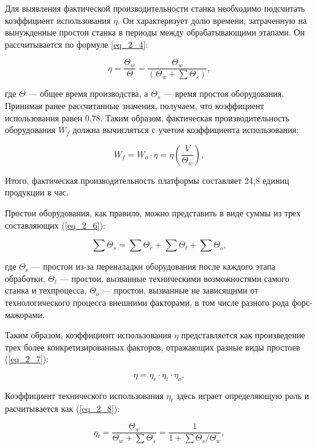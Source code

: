 Для выявления фактической производительности станка необходимо подсчитать коэффициент использования $\eta$. Он характеризует долю времени, затраченную на вынужденные простои станка в периоды между обрабатывающими этапами. Он рассчитывается по формуле \ref{eq_2_4}:

\begin{equation}
\eta = \frac{\Theta_w}{\Theta} = \frac{\Theta_w}{(\Theta_w + \sum \Theta_s)},
\label{eq_2_4}
\end{equation}

где $\Theta$ --- общее время производства, а $\Theta_s$ --- время простоя оборудования. Принимая ранее рассчитанные значения, получаем, что коэффициент использования равен 0,78. Таким образом, фактическая производительность оборудования $W_f$ должна вычисляться с учетом коэффициента использования:

\begin{equation}
W_f = W_o \cdot \eta = \eta (\frac{V}{\Theta_w}),
\label{eq_2_5}
\end{equation}

Итого, фактическая производительность платформы составляет 24,8 единиц продукции в час.

Простои оборудования, как правило, можно представить в виде суммы из трех составляющих (\ref{eq_2_6}):

\begin{equation}
\sum \Theta_s = \sum \Theta_r + \sum \Theta_t + \sum \Theta_o,
\label{eq_2_6}
\end{equation}

где $\Theta_r$ --- простои из-за переналадки оборудования после каждого этапа обработки, $\Theta_t$ --- простои, вызванные техническими возможностями самого станка и техпроцесса, $\Theta_o$ --- простои, вызванные не зависящими от технологического процесса внешними факторами, в том числе разного рода форс-мажорами.

Таким образом, коэффициент использования $\eta$ представляется как произведение трех более конкретизированных факторов, отражающих разные виды простоев (\ref{eq_2_7}):

\begin{equation}
\eta = \eta_r \cdot \eta_t \cdot \eta_o,
\label{eq_2_7}
\end{equation}

Коэффициент технического использования $\eta_t$ здесь играет определяющую роль и расчитывается как (\ref{eq_2_8}):

\begin{equation}
\eta_t = \frac{\Theta_w}{\Theta_w + \sum \Theta_s} = \frac{1}{1+ \sum \Theta_s / \Theta_w},
\label{eq_2_8}
\end{equation}

